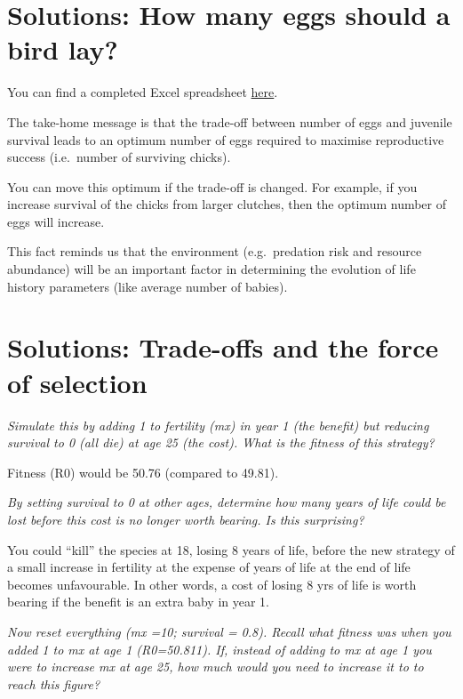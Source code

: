 \documentclass[
  a4paper]{book}
\begin{document}
\section{Solutions: How many eggs should a bird lay?}\label{solutions-how-many-eggs-should-a-bird-lay}

You can find a completed Excel spreadsheet \href{https://www.dropbox.com/s/tcpxmdfvm35jzgr/How\%20many\%20eggs\%20-\%20answers.xlsx?dl=1}{here}.

The take-home message is that the trade-off between number of eggs and juvenile survival leads to an optimum number of eggs required to maximise reproductive success (i.e.~number of surviving chicks).

You can move this optimum if the trade-off is changed. For example, if you increase survival of the chicks from larger clutches, then the optimum number of eggs will increase.

This fact reminds us that the environment (e.g.~predation risk and resource abundance) will be an important factor in determining the evolution of life history parameters (like average number of babies).

\section{Solutions: Trade-offs and the force of selection}\label{solutions-trade-offs-and-the-force-of-selection}

\emph{Simulate this by adding 1 to fertility (mx) in year 1 (the benefit) but reducing survival to 0 (all die) at age 25 (the cost). What is the fitness of this strategy?}

Fitness (R0) would be 50.76 (compared to 49.81).

\emph{By setting survival to 0 at other ages, determine how many years of life could be lost before this cost is no longer worth bearing. Is this surprising?}

You could ``kill'' the species at 18, losing 8 years of life, before the new strategy of a small increase in fertility at the expense of years of life at the end of life becomes unfavourable. In other words, a cost of losing 8 yrs of life is worth bearing if the benefit is an extra baby in year 1.

\emph{Now reset everything (mx =10; survival = 0.8). Recall what fitness was when you added 1 to mx at age 1 (R0=50.811).
If, instead of adding to mx at age 1 you were to increase mx at age 25, how much would you need to increase it to to reach this figure?}
\end{document}
